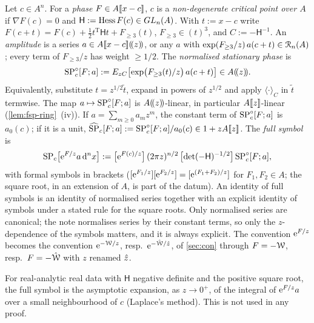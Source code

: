 \begin{defn}
\label{def:fsp-wick}
Let $c\in A^n$. For a \emph{phase} $F\in A[\![ x-c ]\!]$, $c$ is a \emph{non-degenerate critical point over $A$} if $\nabla F(c)=0$ and $\mathsf H:=\operatorname{Hess} F(c)\in GL_n(A)$. With $t:=x-c$ write $F(c+t)=F(c)+\frac12t^{\mathrm T}\mathsf Ht+F_{\geq3}(t)$, $F_{\geq3}\in(t)^3$, and $C:=-\mathsf H^{-1}$. An \emph{amplitude} is a series $a\in A[\![ x-c ]\!](\!(z)\!)$, or any $a$ with $\exp(F_{\geq3}/z)\,a(c+t)\in\mathcal{R}_n(A)$; every term of $F_{\geq3}/z$ has weight $\geq1/2$. The \emph{normalised stationary phase} is
\[
\mathrm{SP}^{\circ}_c[F;a]:=E_{zC}\bigl[\exp\bigl(F_{\geq3}(t)/z\bigr)\,a(c+t)\bigr]\in A(\!(z)\!).
\]
Equivalently, substitute $t=z^{1/2}\tilde t$, expand in powers of $z^{1/2}$ and apply $\langle\cdot\rangle_C$ in $\tilde t$ termwise. The map $a\mapsto\mathrm{SP}^{\circ}_c[F;a]$ is $A(\!(z)\!)$-linear, in particular $A[\![ z ]\!]$-linear (\cref{lem:fsp-ring}~(iv)). If $a=\sum_{m\geq0}a_mz^m$, the constant term of $\mathrm{SP}^{\circ}_c[F;a]$ is $a_0(c)$; if it is a unit, $\widehat{\mathrm{SP}}_c[F;a]:=\mathrm{SP}^{\circ}_c[F;a]/a_0(c)\in1+zA[\![ z ]\!]$. The \emph{full symbol} is
\[
\mathrm{SP}_c\bigl[\mathrm{e}^{F/z}a\,\mathrm{d}^nx\bigr]:=\bigl[\mathrm{e}^{F(c)/z}\bigr]\,(2\pi z)^{n/2}\,\bigl[\det(-\mathsf H)^{-1/2}\bigr]\,\mathrm{SP}^{\circ}_c[F;a],
\]
with formal symbols in brackets ($[\mathrm{e}^{F_1/z}][\mathrm{e}^{F_2/z}]=[\mathrm{e}^{(F_1+F_2)/z}]$ for $F_1,F_2\in A$; the square root, in an extension of $A$, is part of the datum). An identity of full symbols is an identity of normalised series together with an explicit identity of symbols under a stated rule for the square roots. Only normalised series are canonical; the note normalises series by their constant terms, so only the $z$-dependence of the symbols matters, and it is always explicit. The convention $\mathrm{e}^{F/z}$ becomes the convention $\mathrm{e}^{-\mathcal{W}/z}$, resp.\ $\mathrm{e}^{-\hat{\mathcal{W}}/\hat{z}}$, of \cref{sec:con} through $F=-\mathcal{W}$, resp.\ $F=-\hat{\mathcal{W}}$ with $z$ renamed $\hat{z}$.
\end{defn}

\begin{rmk}
\label{rmk:fsp-analytic}
For real-analytic real data with $\mathsf H$ negative definite and the positive square root, the full symbol is the asymptotic expansion, as $z\to0^+$, of the integral of $\mathrm{e}^{F/z}a$ over a small neighbourhood of $c$ (Laplace's method). This is not used in any proof.
\end{rmk}


